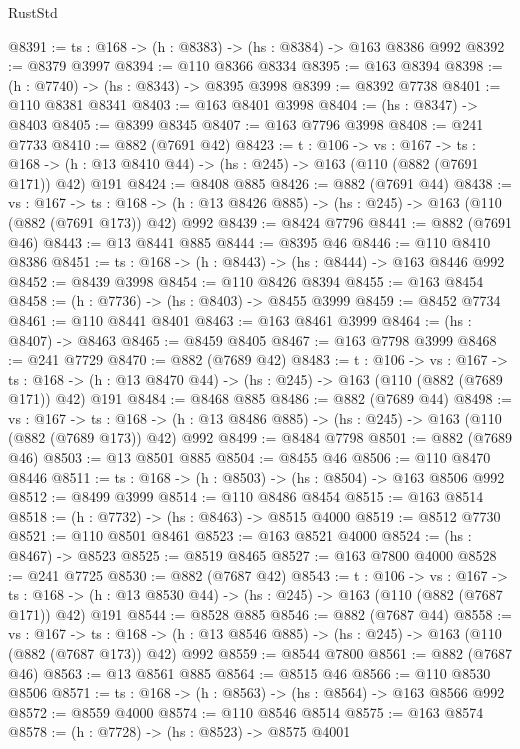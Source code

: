 \begin{lexlean}{RustStd}
\begin{coremodule}
@8391 := {ts : @168} -> (h : @8383) -> (hs : @8384) -> @163 @8386 @992
@8392 := @8379 @3997
@8394 := @110 @8366 @8334
@8395 := @163 @8394
@8398 := (h : @7740) -> (hs : @8343) -> @8395 @3998
@8399 := @8392 @7738
@8401 := @110 @8381 @8341
@8403 := @163 @8401 @3998
@8404 := (hs : @8347) -> @8403
@8405 := @8399 @8345
@8407 := @163 @7796 @3998
@8408 := @241 @7733
@8410 := @882 (@7691 @42)
@8423 := {t : @106} ->
  {vs : @167} ->
  {ts : @168} -> (h : @13 @8410 @44) -> (hs : @245) -> @163 (@110 (@882 (@7691 @171)) @42) @191
@8424 := @8408 @885
@8426 := @882 (@7691 @44)
@8438 := {vs : @167} ->
  {ts : @168} -> (h : @13 @8426 @885) -> (hs : @245) -> @163 (@110 (@882 (@7691 @173)) @42) @992
@8439 := @8424 @7796
@8441 := @882 (@7691 @46)
@8443 := @13 @8441 @885
@8444 := @8395 @46
@8446 := @110 @8410 @8386
@8451 := {ts : @168} -> (h : @8443) -> (hs : @8444) -> @163 @8446 @992
@8452 := @8439 @3998
@8454 := @110 @8426 @8394
@8455 := @163 @8454
@8458 := (h : @7736) -> (hs : @8403) -> @8455 @3999
@8459 := @8452 @7734
@8461 := @110 @8441 @8401
@8463 := @163 @8461 @3999
@8464 := (hs : @8407) -> @8463
@8465 := @8459 @8405
@8467 := @163 @7798 @3999
@8468 := @241 @7729
@8470 := @882 (@7689 @42)
@8483 := {t : @106} ->
  {vs : @167} ->
  {ts : @168} -> (h : @13 @8470 @44) -> (hs : @245) -> @163 (@110 (@882 (@7689 @171)) @42) @191
@8484 := @8468 @885
@8486 := @882 (@7689 @44)
@8498 := {vs : @167} ->
  {ts : @168} -> (h : @13 @8486 @885) -> (hs : @245) -> @163 (@110 (@882 (@7689 @173)) @42) @992
@8499 := @8484 @7798
@8501 := @882 (@7689 @46)
@8503 := @13 @8501 @885
@8504 := @8455 @46
@8506 := @110 @8470 @8446
@8511 := {ts : @168} -> (h : @8503) -> (hs : @8504) -> @163 @8506 @992
@8512 := @8499 @3999
@8514 := @110 @8486 @8454
@8515 := @163 @8514
@8518 := (h : @7732) -> (hs : @8463) -> @8515 @4000
@8519 := @8512 @7730
@8521 := @110 @8501 @8461
@8523 := @163 @8521 @4000
@8524 := (hs : @8467) -> @8523
@8525 := @8519 @8465
@8527 := @163 @7800 @4000
@8528 := @241 @7725
@8530 := @882 (@7687 @42)
@8543 := {t : @106} ->
  {vs : @167} ->
  {ts : @168} -> (h : @13 @8530 @44) -> (hs : @245) -> @163 (@110 (@882 (@7687 @171)) @42) @191
@8544 := @8528 @885
@8546 := @882 (@7687 @44)
@8558 := {vs : @167} ->
  {ts : @168} -> (h : @13 @8546 @885) -> (hs : @245) -> @163 (@110 (@882 (@7687 @173)) @42) @992
@8559 := @8544 @7800
@8561 := @882 (@7687 @46)
@8563 := @13 @8561 @885
@8564 := @8515 @46
@8566 := @110 @8530 @8506
@8571 := {ts : @168} -> (h : @8563) -> (hs : @8564) -> @163 @8566 @992
@8572 := @8559 @4000
@8574 := @110 @8546 @8514
@8575 := @163 @8574
@8578 := (h : @7728) -> (hs : @8523) -> @8575 @4001

\end{coremodule}
\end{lexlean}
